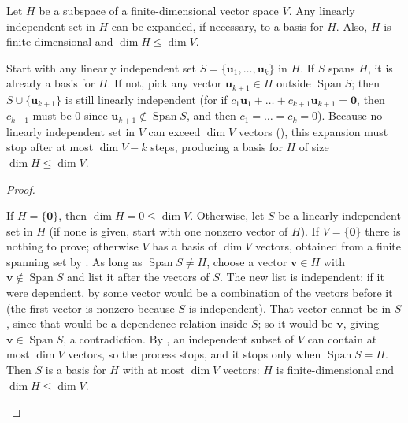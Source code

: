 \documentclass[10pt]{scrartcl}
\newcommand{\vv}[1]{\mathbf{#1}}
\DeclareMathOperator{\spn}{Span}\DeclareMathOperator{\Nul}{Nul}\DeclareMathOperator{\Col}{Col}\DeclareMathOperator{\Row}{Row}\DeclareMathOperator{\nullity}{nullity}
\begin{document}
\begin{theorem*}
  Let $H$ be a subspace of a finite-dimensional vector space $V$. Any linearly independent set in $H$ can be expanded, if necessary, to a basis for $H$. Also, $H$ is finite-dimensional and $\dim H\le\dim V$.
\end{theorem*}
\begin{ideabox}
  Start with any linearly independent set $S=\{\vv u_1,\dots,\vv u_k\}$ in $H$. If $S$ spans $H$, it is already a basis for $H$. If not, pick any vector $\vv u_{k+1}\in H$ outside $\spn S$; then $S\cup\{\vv u_{k+1}\}$ is still linearly independent (for if $c_1\vv u_1+\dots+c_{k+1}\vv u_{k+1}=\vv 0$, then $c_{k+1}$ must be $0$ since $\vv u_{k+1}\notin\spn S$, and then $c_1=\dots=c_k=0$). Because no linearly independent set in $V$ can exceed $\dim V$ vectors (), this expansion must stop after at most $\dim V-k$ steps, producing a basis for $H$ of size $\dim H\le\dim V$.
\end{ideabox}
\begin{proof}
  \begin{steps}
    \ii If $H=\{\vv 0\}$, then $\dim H=0\le\dim V$. Otherwise, let $S$ be a linearly independent set in $H$ (if none is given, start with one nonzero vector of $H$). If $V=\{\vv 0\}$ there is nothing to prove; otherwise $V$ has a basis of $\dim V$ vectors, obtained from a finite spanning set by .
    \ii As long as $\spn S\ne H$, choose a vector $\vv v\in H$ with $\vv v\notin\spn S$ and list it after the vectors of $S$. The new list is independent: if it were dependent, by  some vector would be a combination of the vectors before it (the first vector is nonzero because $S$ is independent). That vector cannot be in $S$, since that would be a dependence relation inside $S$; so it would be $\vv v$, giving $\vv v\in\spn S$, a contradiction.
    \ii By , an independent subset of $V$ can contain at most $\dim V$ vectors, so the process stops, and it stops only when $\spn S=H$. Then $S$ is a basis for $H$ with at most $\dim V$ vectors: $H$ is finite-dimensional and $\dim H\le\dim V$.
  \end{steps}
\end{proof}
\end{document}
